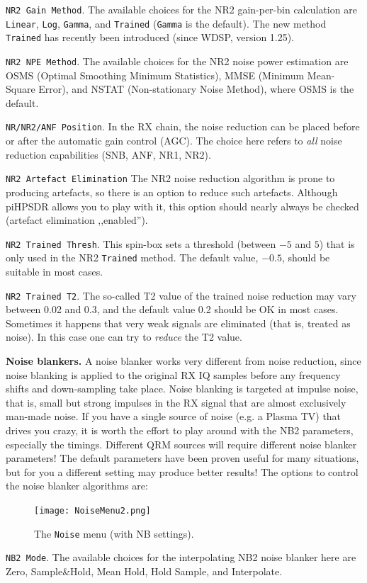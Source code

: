 \documentclass[12pt]{book}
\def\rett#1{\texttt{\color{red}#1}}
\def\bltt#1{\texttt{\color{blue}#1}}
\def\pH{pi\-HPSDR\xspace}
\begin{document}
\rett{NR2 Gain Method}. The available choices for the NR2 gain-per-bin calculation
are \rett{Linear},
\rett{Log}, \rett{Gamma}, and \rett{Trained} (\rett{Gamma} is the default). The new method
\rett{Trained} has recently been introduced (since WDSP, version 1.25).

\rett{NR2 NPE Method}. The available choices for the NR2 noise power estimation
are OSMS
(Optimal Smoothing Minimum Statistics), MMSE (Minimum Mean-Square Error), and
NSTAT (Non-stationary Noise Method),
where OSMS is the default.

\rett{NR/NR2/ANF Position}. In the RX chain, the noise reduction can be placed before or after
the automatic gain control (AGC). The choice here refers to \textit{all} noise reduction
capabilities (SNB, ANF, NR1, NR2).

\rett{NR2 Artefact Elimination} The NR2 noise reduction algorithm is prone to producing
artefacts, so there is an option to reduce such artefacts.
Although \pH allows you to play with it, this option should nearly always be
checked (artefact elimination ,,enabled'').

\rett{NR2 Trained Thresh}. This spin-box sets a threshold (between $-5$ and $5$)
that is only used in the NR2 \rett{Trained} method. The default value, $-0.5$, should be
suitable in most cases.

\rett{NR2 Trained T2}. The so-called T2 value of the trained noise reduction may vary between
0.02 and 0.3, and the default value 0.2 should be OK in most cases. Sometimes it happens that
very weak signals are eliminated (that is, treated as noise). In this case one can try to \textit{reduce} the
T2 value.


\textbf{Noise blankers.} A noise blanker works very different from  noise reduction, since noise blanking
is applied to the original RX IQ samples before any frequency shifts and down-sampling take place.
Noise blanking is targeted at impulse noise, that is, small but strong impulses in the RX
signal that are almost exclusively man-made noise.
If you have a single source of noise (e.g. a Plasma TV) that drives you crazy, it is worth
the effort to play around with the NB2 parameters, especially the timings. Different
QRM sources will require different noise blanker parameters! The default parameters have been proven useful
for many situations, but for you a different setting may produce better results!
The options to control the noise blanker algorithms are:

\begin{figure}[ht]
\center
\texttt{[image: NoiseMenu2.png]}
\caption{The \bltt{Noise} menu (with NB settings).}
\label{fig:NoiseMenu2}
\end{figure}
\rett{NB2 Mode}. The available choices for the interpolating NB2 noise blanker here are Zero,
Sample\&Hold, Mean Hold, Hold Sample, and Interpolate.
\end{document}
